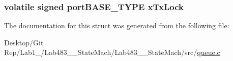 \hypertarget{struct_queue_definition_a4e0a97a74ff0c54c4f52fada8af05562}{
\subsubsection[{x\-Tx\-Lock}]{\setlength{\rightskip}{0pt plus 5cm}volatile signed {\bf port\-B\-A\-S\-E\-\_\-\-T\-Y\-P\-E} x\-Tx\-Lock}}\label{struct_queue_definition_a4e0a97a74ff0c54c4f52fada8af05562}


The documentation for this struct was generated from the following file\-:\begin{DoxyCompactItemize}
\item 
Desktop/\-Git Rep/\-Lab1\-\_/\-Lab483\-\_\-\_\-\-State\-Mach/\-Lab483\-\_\-\_\-\-State\-Mach/src/\hyperlink{queue_8c}{queue.\-c}\end{DoxyCompactItemize}
